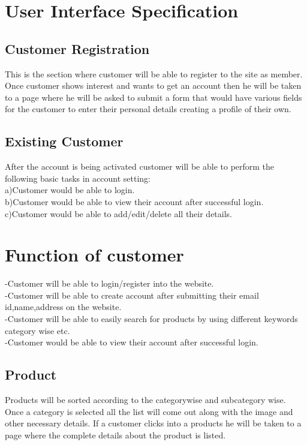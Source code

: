 \documentclass{article}
\begin{document}
\section{ User Interface Specification
}

\subsection{Customer Registration}
This is the section where customer will be able to register to the
site as member. Once customer shows interest and wants to get an
account then he will be taken to a page where he will be
asked to submit a form that would have various fields for the
customer to enter their personal details creating a profile of their
own.\\

\subsection{Existing Customer}
After the account is being activated customer will be able to
perform the following basic tasks in account setting:\\
a)Customer would be able to login.\\
b)Customer would be able to view their account after successful
login.\\
c)Customer would be able to add/edit/delete all their details.\\

\section{Function of customer}
-Customer will be able to login/register into the website.\\
-Customer will be able to create account after submitting their
email id,name,address on the website.\\
-Customer will be able to easily search for products by using
different keywords category wise etc.\\
-Customer would be able to view their account after successful
login.\\



\subsection{Product}
Products will be sorted according to the categorywise and
subcategory wise. Once a category is selected all the list will come
out along with the image and other necessary details. If a customer
clicks into a products he will be taken to a page where the
complete details about the product is listed.\\
\end{document}
